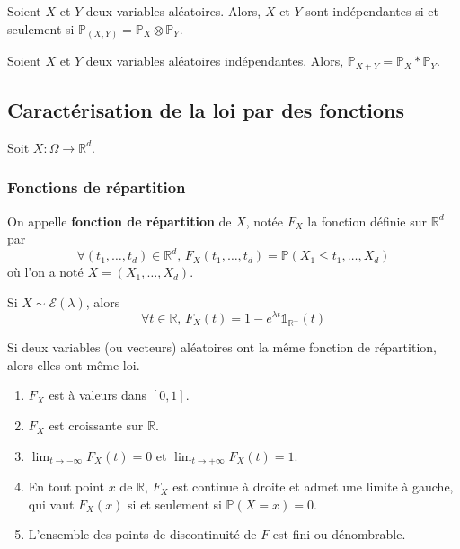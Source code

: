   \begin{theorem}
    Soient $X$ et $Y$ deux variables aléatoires. Alors, $X$ et $Y$ sont indépendantes si et seulement si $\mathbb{P}_{(X,Y)} = \mathbb{P}_X \otimes \mathbb{P}_Y$.
  \end{theorem}

  \begin{corollary}
    Soient $X$ et $Y$ deux variables aléatoires indépendantes. Alors, $\mathbb{P}_{X+Y} = \mathbb{P}_X * \mathbb{P}_Y$.
  \end{corollary}

  \subsection{Caractérisation de la loi par des fonctions}

  Soit $X : \Omega \rightarrow \mathbb{R}^d$.

  \subsubsection{Fonctions de répartition}


  \begin{definition}
    On appelle \textbf{fonction de répartition} de $X$, notée $F_X$ la fonction définie sur $\mathbb{R}^d$ par
    \[ \forall (t_1, \dots, t_d) \in \mathbb{R}^d, \, F_X(t_1, \dots, t_d) = \mathbb{P}(X_1 \leq t_1, \dots, X_d) \]
    où l'on a noté $X = (X_1, \dots, X_d)$.
  \end{definition}


  \begin{example}
    Si $X \sim \mathcal{E}(\lambda)$, alors
    \[ \forall t \in \mathbb{R}, \, F_X(t) = 1 - e^{\lambda t} \mathbb{1}_{\mathbb{R}^+}(t) \]
  \end{example}


  \begin{theorem}
    Si deux variables (ou vecteurs) aléatoires ont la même fonction de répartition, alors elles ont même loi.
  \end{theorem}

  \begin{theorem}
    \begin{enumerate}[label=(\roman*)]
      \item $F_X$ est à valeurs dans $[0,1]$.
      \item $F_X$ est croissante sur $\mathbb{R}$.
      \item $\lim_{t \rightarrow -\infty} F_X(t) = 0$ et $\lim_{t \rightarrow +\infty} F_X(t) = 1$.
      \item En tout point $x$ de $\mathbb{R}$, $F_X$ est continue à droite et admet une limite à gauche, qui vaut $F_X(x)$ si et seulement si $\mathbb{P}(X=x) = 0$.
      \item L'ensemble des points de discontinuité de $F$ est fini ou dénombrable.
    \end{enumerate}
  \end{theorem}

